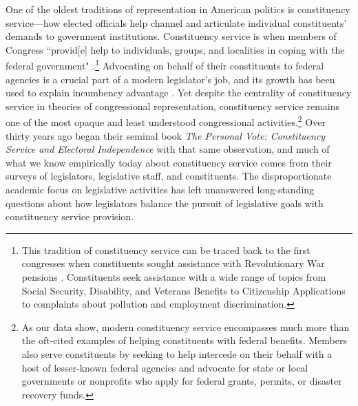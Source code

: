 \documentclass[12pt]{article}
\begin{document}
One of the oldest traditions of representation in American politics is constituency service---how elected officials help channel and articulate individual constituents' demands to government institutions. Constituency service is when members of Congress ``provid[e] help to individuals, groups, and localities in coping with the federal government" \citep{Fenno1978}.\footnote{This tradition of constituency service can be traced back to the first congresses when constituents sought assistance with Revolutionary War pensions \citep{Eckman2017}. Constituents seek assistance with a wide range of topics from Social Security, Disability, and Veterans Benefits to Citizenship Applications to complaints about pollution and employment discrimination.} Advocating on behalf of their constituents to federal agencies is a crucial part of a modern legislator's job, and its growth has been used to explain incumbency advantage \citep{King1991}. Yet despite the centrality of constituency service in theories of congressional representation, constituency service remains one of the most opaque and least understood congressional activities.\footnote{As our data show, modern constituency service encompasses much more than the oft-cited examples of helping constituents with federal benefits. Members also serve constituents by seeking to help intercede on their behalf with a host of lesser-known federal agencies and advocate for state or local governments or nonprofits who apply for federal grants, permits, or disaster recovery funds.} Over thirty years ago \citet*{CainFerejohnFiorina1987} began their seminal book \emph{The Personal Vote: Constituency Service and Electoral Independence} with that same observation, and much of what we know empirically today about constituency service comes from their surveys of legislators, legislative staff, and constituents. The disproportionate academic focus on legislative activities has left unanswered long-standing questions about how legislators balance the pursuit of legislative goals with constituency service provision. 
\end{document}
